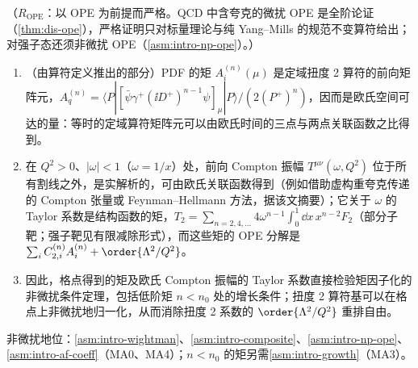 \begin{proposition}\label{prop:lattice-moments}
（$R_{\mathrm{OPE}}$：以 OPE 为前提而严格。QCD 中含夸克的微扰 OPE 是全阶论证（\cref{thm:dis-ope}），严格证明只对标量理论与纯 Yang--Mills 的规范不变算符给出；对强子态还须非微扰 OPE（\cref{asm:intro-np-ope}）。）
\begin{enumerate}[label=(\alph*),leftmargin=2em,itemsep=1pt,topsep=2pt]
\item （由算符定义推出的部分）PDF 的矩 $A^{(n)}_i(\mu)$ 是定域扭度 2 算符的前向矩阵元，$A^{(n)}_q=\langle P|[\bar\psi\gamma^+(\ii D^+)^{n-1}\psi]_\mu|P\rangle/(2(P^+)^n)$，因而是欧氏空间可达的量：等时的定域算符矩阵元可以由欧氏时间的三点与两点关联函数之比得到。
\item 在 $Q^2>0$、$|\omega|<1$（$\omega=1/x$）处，前向 Compton 振幅 $T^{\mu\nu}(\omega,Q^2)$ 位于所有割线之外，是实解析的，可由欧氏关联函数得到（例如借助虚构重夸克传递的 Compton 张量\cite{DetmoldLin2006}或 Feynman--Hellmann 方法\cite{ChambersEtAl2017}，据该文摘要）；它关于 $\omega$ 的 Taylor 系数是结构函数的矩，$T_2=\sum_{n=2,4,\dots}4\omega^{n-1}\int_0^1\dd x\,x^{n-2}F_2$（部分子靶；强子靶见有限减除形式），而这些矩的 OPE 分解是 $\sum_iC^{(n)}_{2,i}A^{(n)}_i+\order{\Lambda^2/Q^2}$。
\item 因此，格点得到的矩及欧氏 Compton 振幅的 Taylor 系数直接检验矩因子化的非微扰条件定理，包括低阶矩 $n<n_0$ 处的增长条件；扭度 2 算符基可以在格点上非微扰地归一化，从而消除扭度 2 系数的 $\order{\Lambda^2/Q^2}$ 重排自由。
\end{enumerate}
非微扰地位：\cref{asm:intro-wightman}、\cref{asm:intro-composite}、\cref{asm:intro-np-ope}、\cref{asm:intro-af-coeff}（MA0、MA4）；$n<n_0$ 的矩另需\cref{asm:intro-growth}（MA3）。
\end{proposition}

